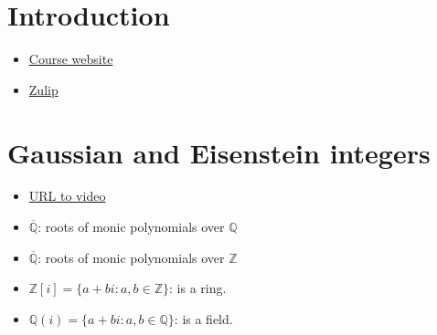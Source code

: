 \documentclass{book}
\theoremstyle{definition}
\newcommand{\Q}{\mathbb Q}
\newcommand{\Z}{\mathbb Z}
\newcommand{\Qbar}{\overline{\Q}}
\newcommand{\Zbar}{\overline{\Q}}
\begin{document}
\chapter{Introduction}
\begin{itemize}
\item \href{https://math.ucsd.edu/~kedlaya/math204a/}{Course website}
\item \href{https://math204-ucsd.zulipchat.com/}{Zulip}
\end{itemize}

\chapter{Gaussian and Eisenstein integers}
\begin{itemize}
\item \href{https://ucsd-som.hosted.panopto.com/Panopto/Pages/Viewer.aspx?id=d5e9fee8-0edb-4d55-9ff6-ac4b01318006}{URL to video}
\end{itemize}

\begin{itemize}
\item $\Qbar$: roots of monic polynomials over $\Q$
\item $\Zbar$: roots of monic polynomials over $\Z$
\item $\Z[i] = \{ a + b i : a, b \in \Z \}$: is a ring.
\item $\Q(i) = \{ a + b i : a, b \in \Q \}$: is a field.
\end{itemize}
\end{document}

